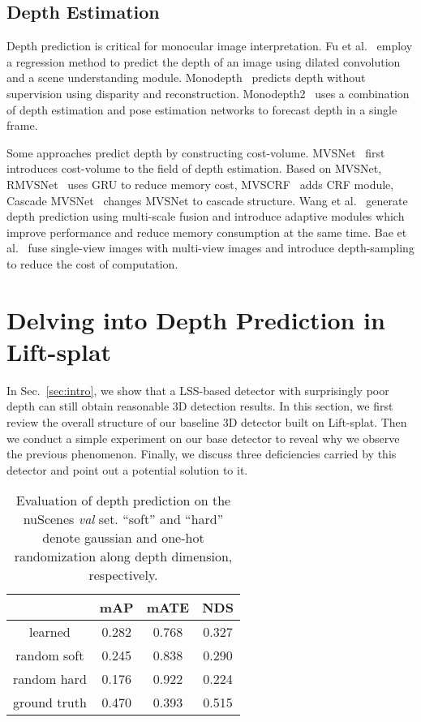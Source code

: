 \documentclass[twocolumn,letterpaper]{article}
\begin{document}
\subsection{Depth Estimation}
Depth prediction is critical for monocular image interpretation. Fu et al.~\cite{fu2018deep} employ a regression method to predict the depth of an image using dilated convolution and a scene understanding module. Monodepth~\cite{godard2017unsupervised} predicts depth without supervision using disparity and reconstruction. Monodepth2~\cite{godard2019digging} uses a combination of depth estimation and pose estimation networks to forecast depth in a single frame.

Some approaches predict depth by constructing cost-volume. MVSNet~\cite{yao2018mvsnet} first introduces cost-volume to the field of depth estimation. Based on MVSNet, RMVSNet~\cite{yao2019recurrent} uses GRU to reduce memory cost, MVSCRF~\cite{xue2019mvscrf} adds CRF module, Cascade MVSNet~\cite{gu2020cascade} changes MVSNet to cascade structure. Wang et al.~\cite{wang2021patchmatchnet} generate depth prediction using multi-scale fusion and introduce adaptive modules which improve performance and reduce memory consumption at the same time. Bae et al.~\cite{bae2022multi} fuse single-view images with multi-view images and introduce depth-sampling to reduce the cost of computation.

\section{Delving into Depth Prediction in Lift-splat} \label{sec3}

In Sec.~\ref{sec:intro}, we show that a LSS-based detector with surprisingly poor depth can still obtain reasonable 3D detection results. In this section, we first review the overall structure of our baseline 3D detector built on Lift-splat. Then we conduct a simple experiment on our base detector to reveal why we observe the previous phenomenon. Finally, we discuss three deficiencies carried by this detector and point out a potential solution to it.

\begin{table}[!t]
\centering
\begin{tabular}{c|ccc} 
\toprule
\textbf{} &\textbf{mAP}   & \textbf{mATE} & \textbf{NDS} \\
\midrule
 learned    & 0.282 & 0.768 & 0.327      \\
 random soft& 0.245 & 0.838 & 0.290   \\
 random hard& 0.176 &	0.922 & 0.224 \\ \midrule
 ground truth & 0.470 & 0.393 & 0.515 \\
 \bottomrule
\end{tabular}
\caption{Evaluation of depth prediction on the nuScenes \emph{val} set. ``soft'' and ``hard'' denote gaussian and one-hot randomization along depth dimension, respectively.}\label{tab:random}
\end{table}
\end{document}
